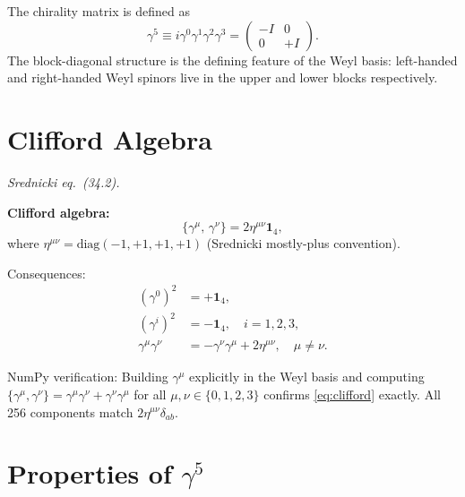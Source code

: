 \documentclass[12pt]{article}
\newcommand{\verified}[1]{\textcolor{verifygreen}{\checkmark\; #1}}
\begin{document}
The chirality matrix is defined as
\begin{equation}\label{eq:gamma5-def}
  \gamma^5 \equiv i\gamma^0\gamma^1\gamma^2\gamma^3
  = \begin{pmatrix}-I&0\\0&+I\end{pmatrix}.
\end{equation}
The block-diagonal structure is the defining feature of the Weyl basis: left-handed
and right-handed Weyl spinors live in the upper and lower blocks respectively.

\section{Clifford Algebra}

\textit{Srednicki eq.\ (34.2).}

\begin{mdframed}[backgroundcolor=blue!5]
\textbf{Clifford algebra:}
\begin{equation}\label{eq:clifford}
  \{\gamma^\mu,\, \gamma^\nu\} = 2\eta^{\mu\nu}\mathbf{1}_4,
\end{equation}
where $\eta^{\mu\nu} = \mathrm{diag}(-1,+1,+1,+1)$ (Srednicki mostly-plus convention).
\end{mdframed}

Consequences:
\begin{align}
  (\gamma^0)^2 &= +\mathbf{1}_4, \\
  (\gamma^i)^2 &= -\mathbf{1}_4, \quad i=1,2,3, \\
  \gamma^\mu\gamma^\nu &= -\gamma^\nu\gamma^\mu + 2\eta^{\mu\nu}, \quad \mu\neq\nu.
\end{align}

\begin{mdframed}[backgroundcolor=green!5]
\verified{NumPy verification:} Building $\gamma^\mu$ explicitly in the Weyl basis and
computing $\{\gamma^\mu,\gamma^\nu\} = \gamma^\mu\gamma^\nu + \gamma^\nu\gamma^\mu$
for all $\mu,\nu\in\{0,1,2,3\}$ confirms \eqref{eq:clifford} exactly.
All 256 components match $2\eta^{\mu\nu}\delta_{ab}$.
\end{mdframed}

\section{Properties of $\gamma^5$}
\end{document}
